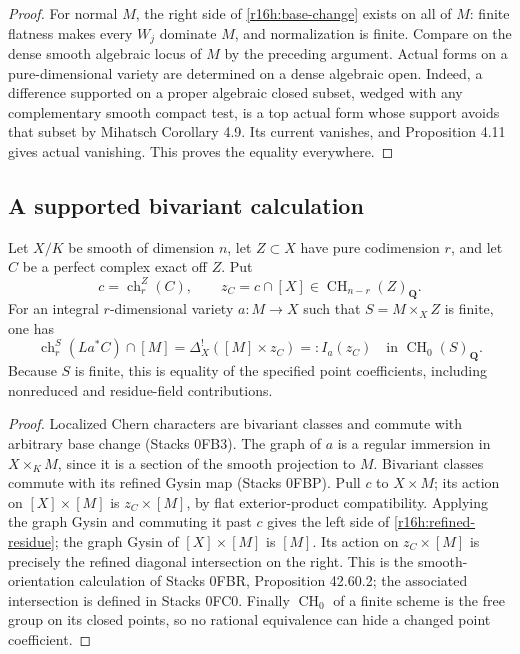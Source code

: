 \begin{proof}
For normal $M$, the right side of \eqref{r16h:base-change} exists on all
of $M$: finite flatness makes every $W_j$ dominate $M$, and normalization
is finite. Compare on the dense smooth algebraic locus of $M$ by the
preceding argument. Actual forms on a pure-dimensional variety are
determined on a dense algebraic open. Indeed, a difference supported
on a proper algebraic closed subset, wedged with any complementary
smooth compact test, is a top actual form whose support avoids that
subset by Mihatsch Corollary 4.9. Its current vanishes, and Proposition
4.11 gives actual vanishing. This proves the equality everywhere.
\end{proof}

\subsection{A supported bivariant calculation}

\begin{lemma}
\label{r16h:algebraic-residue}
Let $X/K$ be smooth of dimension $n$, let $Z\subset X$ have pure
codimension $r$, and let $C$ be a perfect complex exact off $Z$. Put
\[
 c=\operatorname{ch}_r^Z(C),\qquad z_C=c\cap[X]\in\operatorname{CH}_{n-r}(Z)_{\mathbf Q}.
\]
For an integral $r$-dimensional variety $a:M\to X$ such that
$S=M\times_X Z$ is finite, one has
\[
 \operatorname{ch}_r^S(La^*C)\cap[M]
       =\Delta_X^!([M]\times z_C)
       =:I_a(z_C)\quad\text{in }\operatorname{CH}_0(S)_{\mathbf Q}.
 \tag{H16.3}\label{r16h:refined-residue}
\]
Because $S$ is finite, this is equality of the specified point
coefficients, including nonreduced and residue-field contributions.
\end{lemma}

\begin{proof}
Localized Chern characters are bivariant classes and commute with
arbitrary base change (Stacks 0FB3). The graph of $a$ is a regular
immersion in $X\times_K M$, since it is a section of the smooth
projection to $M$. Bivariant classes commute with its refined Gysin map
(Stacks 0FBP). Pull $c$ to $X\times M$; its action on $[X]\times[M]$
is $z_C\times[M]$, by flat exterior-product compatibility. Applying
the graph Gysin and commuting it past $c$ gives the left side of
\eqref{r16h:refined-residue}; the graph Gysin of $[X]\times[M]$ is
$[M]$. Its action on $z_C\times[M]$ is precisely the refined diagonal
intersection on the right. This is the smooth-orientation calculation
of Stacks 0FBR, Proposition 42.60.2; the associated intersection is
defined in Stacks 0FC0. Finally $\operatorname{CH}_0$ of a finite
scheme is the free group on its closed points, so no rational
equivalence can hide a changed point coefficient.
\end{proof}

